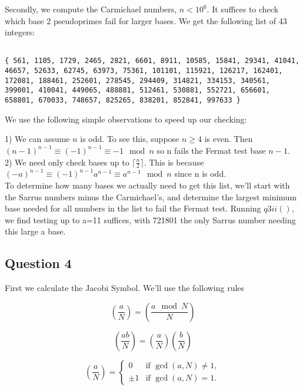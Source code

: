 \documentclass[10pt,a4paper]{report}
\newcommand{\legendre}[2]{(\frac{#1}{#2})}
\begin{document}
Secondly, we compute the Carmichael numbers, $n < 10^6$.  It suffices to check which base 2 pseudoprimes fail for larger bases. We get the following list of 43 integers: 

\begin{lstlisting}[breaklines]

{ 561, 1105, 1729, 2465, 2821, 6601, 8911, 10585, 15841, 29341, 41041, 46657, 52633, 62745, 63973, 75361, 101101, 115921, 126217, 162401, 172081, 188461, 252601, 278545, 294409, 314821, 334153, 340561, 399001, 410041, 449065, 488881, 512461, 530881, 552721, 656601, 658801, 670033, 748657, 825265, 838201, 852841, 997633 }

\end{lstlisting}

We use the following simple observations to speed up our checking:

1) We can assume $n$ is odd. To see this, suppose $n\geq4$ is even. Then $(n-1)^{n-1}\equiv (-1)^{n-1}\equiv-1 \mod n$ so n fails the Fermat test base $n-1$.\\

2) We need only check bases up to $\lceil\frac{n}{2}\rceil$. This is because $(-a)^{n-1}\equiv (-1)^{n-1}a^{n-1}\equiv a^{n-1} \mod n$ since n is odd.\\

To determine how many bases we actually need to get this list, we'll start with the Sarrus numbers minus the Carmichael's, and determine the largest minimum base needed for all numbers in the list to fail the Fermat test. Running $q3ii()$, we find testing up to a=11 suffices, with 721801 the only Sarrus number needing this large a base.

\subsection*{Question 4}

First we calculate the Jacobi Symbol. We'll use the following rules

\begin{equation*}
\legendre{a}{N} = \legendre{a\mod N}{N}
\tag{1}
\end{equation*}

\begin{equation*}
\legendre{ab}{N} = \legendre{a}{N}\legendre{b}{N}
\tag{2}
\end{equation*}

\begin{equation*}
\legendre{a}{N} =
\begin{cases}
0 & \text{if } \gcd(a,N) \ne 1,\\
\pm1 & \text{if } \gcd(a,N) = 1.
\end{cases}
\tag{3}
\end{equation*}
\end{document}
